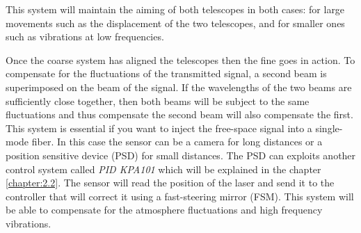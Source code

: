 This system will maintain the aiming of both telescopes in both cases: for large movements such as the displacement of the two telescopes, and for smaller ones such as vibrations at low frequencies.



Once the coarse system has aligned the telescopes then the fine goes in action. To compensate for the fluctuations of the transmitted signal, a second beam is superimposed on the beam of the signal. If the wavelengths of the two beams are sufficiently close together, then both beams will be subject to the same fluctuations and thus compensate the second beam will also compensate the first.
This system is essential if you want to inject the free-space signal into a single-mode fiber. In this case the sensor can be a camera for long distances or a position sensitive device (PSD) for small distances.
The PSD can exploits another control system called \textit{PID KPA101} which will be explained in the chapter \ref{chapter:2.2}. The sensor will read the position of the laser and send it to the controller that will correct it using a fast-steering mirror (FSM). This system will be able to compensate for the atmosphere fluctuations and high frequency vibrations.

